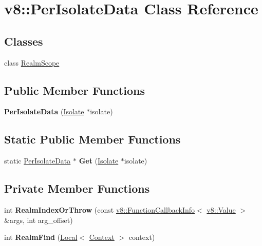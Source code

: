 \hypertarget{classv8_1_1_per_isolate_data}{}\section{v8\+:\+:Per\+Isolate\+Data Class Reference}
\label{classv8_1_1_per_isolate_data}
\subsection*{Classes}
\begin{DoxyCompactItemize}
\item 
class \hyperlink{classv8_1_1_per_isolate_data_1_1_realm_scope}{Realm\+Scope}
\end{DoxyCompactItemize}
\subsection*{Public Member Functions}
\begin{DoxyCompactItemize}
\item 
{\bfseries Per\+Isolate\+Data} (\hyperlink{classv8_1_1_isolate}{Isolate} $\ast$isolate)\hypertarget{classv8_1_1_per_isolate_data_aa17501de2d70dd2fc3e7cbbe32f9b182}{}\label{classv8_1_1_per_isolate_data_aa17501de2d70dd2fc3e7cbbe32f9b182}

\end{DoxyCompactItemize}
\subsection*{Static Public Member Functions}
\begin{DoxyCompactItemize}
\item 
static \hyperlink{classv8_1_1_per_isolate_data}{Per\+Isolate\+Data} $\ast$ {\bfseries Get} (\hyperlink{classv8_1_1_isolate}{Isolate} $\ast$isolate)\hypertarget{classv8_1_1_per_isolate_data_adb0772e04fefdf4c51d199539b5eba5a}{}\label{classv8_1_1_per_isolate_data_adb0772e04fefdf4c51d199539b5eba5a}

\end{DoxyCompactItemize}
\subsection*{Private Member Functions}
\begin{DoxyCompactItemize}
\item 
int {\bfseries Realm\+Index\+Or\+Throw} (const \hyperlink{classv8_1_1_function_callback_info}{v8\+::\+Function\+Callback\+Info}$<$ \hyperlink{classv8_1_1_value}{v8\+::\+Value} $>$ \&args, int arg\+\_\+offset)\hypertarget{classv8_1_1_per_isolate_data_a4a108e562bce1360df504e861e7e8be7}{}\label{classv8_1_1_per_isolate_data_a4a108e562bce1360df504e861e7e8be7}

\item 
int {\bfseries Realm\+Find} (\hyperlink{classv8_1_1_local}{Local}$<$ \hyperlink{classv8_1_1_context}{Context} $>$ context)\hypertarget{classv8_1_1_per_isolate_data_a9de418c6c940efb33d025df38c2c0c67}{}\label{classv8_1_1_per_isolate_data_a9de418c6c940efb33d025df38c2c0c67}

\end{DoxyCompactItemize}

